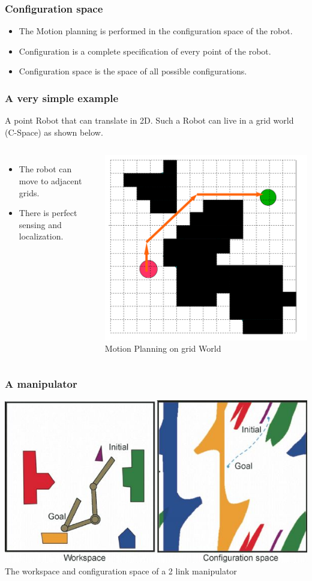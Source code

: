 \documentclass{beamer}
\begin{document}
\begin{frame}
\frametitle{Configuration space}

\begin{itemize}
\item The Motion planning is performed in the configuration space of the robot.
\item Configuration is a complete specification of every point of the robot.
\item Configuration space is the space of all possible configurations.
\end{itemize}

\end{frame}
\begin{frame}
\frametitle{A very simple example}
A point Robot that can translate in 2D. Such a Robot can live in a grid world (C-Space) as shown below.

\begin{columns}[c] 
\begin{itemize}
\item The robot can move to adjacent grids.
\item There is perfect sensing and localization. 
\end{itemize}

\centering
 \includegraphics[width=.45\textwidth]{figures/gridworld.png}\\
Motion Planning on grid World 
\end{columns}
\end{frame}
\begin{frame}
\frametitle{A manipulator}
\centering
 \includegraphics[width=.7\textwidth]{figures/manipulator_cspace.jpg}\\
The workspace and configuration space of a 2 link manipulator
\end{frame}
\end{document}
